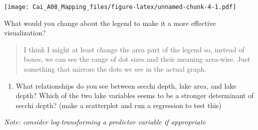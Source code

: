 \documentclass[]{article}
\newenvironment{Shaded}{\begin{snugshade}}{\end{snugshade}}
\newcommand{\DataTypeTok}[1]{\textcolor[rgb]{0.13,0.29,0.53}{#1}}
\newcommand{\DecValTok}[1]{\textcolor[rgb]{0.00,0.00,0.81}{#1}}
\newcommand{\FloatTok}[1]{\textcolor[rgb]{0.00,0.00,0.81}{#1}}
\newcommand{\KeywordTok}[1]{\textcolor[rgb]{0.13,0.29,0.53}{\textbf{#1}}}
\newcommand{\NormalTok}[1]{#1}
\newcommand{\OperatorTok}[1]{\textcolor[rgb]{0.81,0.36,0.00}{\textbf{#1}}}
\newcommand{\StringTok}[1]{\textcolor[rgb]{0.31,0.60,0.02}{#1}}
\providecommand{\tightlist}{%
  \setlength{\itemsep}{0pt}\setlength{\parskip}{0pt}}
\begin{document}
\texttt{[image: Cai\_A08\_Mapping\_files/figure-latex/unnamed-chunk-4-1.pdf]}

What would you change about the legend to make it a more effective
visualization?

\begin{quote}
I think I might at least change the area part of the legend so, instead
of boxes, we can see the range of dot sizes and their meaning area-wise.
Just something that mirrors the dots we see in the actual graph.
\end{quote}

\begin{enumerate}
\def\labelenumi{\arabic{enumi}.}
\setcounter{enumi}{8}
\tightlist
\item
  What relationships do you see between secchi depth, lake area, and
  lake depth? Which of the two lake variables seems to be a stronger
  determinant of secchi depth? (make a scatterplot and run a regression
  to test this)
\end{enumerate}

\emph{Note: consider log-transforming a predictor variable if
appropriate}

\begin{Shaded}
\end{Shaded}
\end{document}
